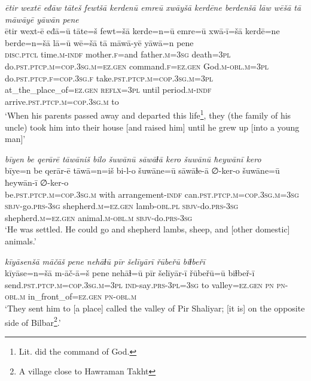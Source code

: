\ea \label{ZP.8}
\textit{ētir wextē eđāw tāteš fewtšā kerdenū emreū xwāyšā kerdēne berdenšā lāw wēšā tā māwāyē yāwān pene} \\ 
\gll ētir wext-ē eđā=ū tāte=š fewt=šā kerde=n=ū emre=ū xwā-ī=šā kerdē=ne berde=n=šā lā=ū wē=šā tā māwā-yē yāwā=n pene \\ 
 \textsc{disc.ptcl} time\textsc{.m}\textsc{-indf} mother\textsc{.f}=and father\textsc{.m}\textsc{=3sg} death\textsc{=3pl} do\textsc{.pst}\textsc{.ptcp}\textsc{.m}\textsc{=cop}\textsc{.3sg}\textsc{.m}\textsc{\textsc{=ez.gen}} command\textsc{.f}\textsc{\textsc{=ez.gen}} God\textsc{.m}\textsc{-obl}\textsc{.m}\textsc{=3pl} do\textsc{.pst}\textsc{.ptcp}\textsc{.f}\textsc{=cop}\textsc{.3sg}\textsc{.f} take\textsc{.pst}\textsc{.ptcp}\textsc{.m}\textsc{=cop}\textsc{.3sg}\textsc{.m}\textsc{=3pl} at\_the\_place\_of\textsc{\textsc{=ez.gen}} \textsc{reflx}\textsc{=3pl} until period\textsc{.m}\textsc{-indf} arrive\textsc{.pst}\textsc{.ptcp}\textsc{.m}\textsc{=cop}\textsc{.3sg}\textsc{.m} to \\ 
\glt `When his parents passed away and departed this life\footnote{Lit. did the command of God.}, they (the family of his uncle) took him into their house [and raised him] until he grew up [into a young man]'
\z 
 
\ea \label{ZP.9}
\textit{bīyen be qerārē tāwāniš bilo šuwānū sāwāɫā kero šuwānū ħeywānī kero} \\ 
\gll bīye=n be qerār-ē tāwā=n=iš bi-l-o šuwāne=ū sāwāɫe-ā ∅-ker-o šuwāne=ū ħeywān-ī ∅-ker-o \\ 
 be\textsc{.pst}\textsc{.ptcp}\textsc{.m}\textsc{=cop}\textsc{.3sg}\textsc{.m} with arrangement\textsc{-indf} can\textsc{.pst}\textsc{.ptcp}\textsc{.m}\textsc{=cop}\textsc{.3sg}\textsc{.m}\textsc{=3sg} \textsc{sbjv-}go\textsc{.prs}\textsc{-3sg} shepherd\textsc{.m}\textsc{\textsc{=ez.gen}} lamb\textsc{-obl}\textsc{.pl} \textsc{sbjv-}do\textsc{.prs}\textsc{-3sg} shepherd\textsc{.m}\textsc{\textsc{=ez.gen}} animal\textsc{.m}\textsc{-obl}\textsc{.m} \textsc{sbjv-}do\textsc{.prs}\textsc{-3sg} \\ 
\glt `He was settled. He could go and shepherd lambs, sheep, and [other domestic] animals.'
\z 
 
\ea \label{ZP.10}
\textit{kīyāsenšā māčāš pene nehāɫū pīr šelīyārī řūbeřū biɫbeřī} \\ 
\gll kīyāse=n=šā m-āč-ā=š pene nehāɫ=ū pīr šelīyār-ī řūbeřū=ū biɫbeř-ī \\ 
 send\textsc{.pst}\textsc{.ptcp}\textsc{.m}\textsc{=cop}\textsc{.3sg}\textsc{.m}\textsc{=3pl} \textsc{ind-}say\textsc{.prs}\textsc{-3pl}\textsc{=3sg} to valley\textsc{\textsc{=ez.gen}} \textsc{pn} \textsc{pn}\textsc{-obl}\textsc{.m} in\_front\_of\textsc{\textsc{=ez.gen}} \textsc{pn}\textsc{-obl}\textsc{.m} \\ 
\glt `They sent him to [a place] called the valley of Pir Shaliyar; [it is] on the opposite side of Bilbar\footnote{A village close to Hawraman Takht}.'
\z 
 
